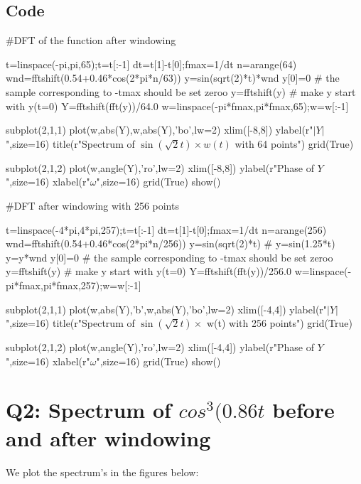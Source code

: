 \documentclass[11pt]{article}
\begin{document}
\subsection{Code}
\begin{python}
#DFT of the function after windowing

t=linspace(-pi,pi,65);t=t[:-1]
dt=t[1]-t[0];fmax=1/dt
n=arange(64)
wnd=fftshift(0.54+0.46*cos(2*pi*n/63))
y=sin(sqrt(2)*t)*wnd
y[0]=0 # the sample corresponding to -tmax should be set zeroo
y=fftshift(y) # make y start with y(t=0)
Y=fftshift(fft(y))/64.0
w=linspace(-pi*fmax,pi*fmax,65);w=w[:-1]

subplot(2,1,1)
plot(w,abs(Y),w,abs(Y),'bo',lw=2)
xlim([-8,8])
ylabel(r"$|Y|$",size=16)
title(r"Spectrum of $\sin\left(\sqrt{2}t\right)\times w(t)$ with 64 points")
grid(True)

subplot(2,1,2)
plot(w,angle(Y),'ro',lw=2)
xlim([-8,8])
ylabel(r"Phase of $Y$",size=16)
xlabel(r"$\omega$",size=16)
grid(True)
show()

#DFT after windowing with 256 points


t=linspace(-4*pi,4*pi,257);t=t[:-1]
dt=t[1]-t[0];fmax=1/dt
n=arange(256)
wnd=fftshift(0.54+0.46*cos(2*pi*n/256))
y=sin(sqrt(2)*t)
# y=sin(1.25*t)
y=y*wnd
y[0]=0 # the sample corresponding to -tmax should be set zeroo
y=fftshift(y) # make y start with y(t=0)
Y=fftshift(fft(y))/256.0
w=linspace(-pi*fmax,pi*fmax,257);w=w[:-1]

subplot(2,1,1)
plot(w,abs(Y),'b',w,abs(Y),'bo',lw=2)
xlim([-4,4])
ylabel(r"$|Y|$",size=16)
title(r"Spectrum of $\sin\left(\sqrt{2}t\right)\times$ w(t) with 256 points")
grid(True)

subplot(2,1,2)
plot(w,angle(Y),'ro',lw=2)
xlim([-4,4])
ylabel(r"Phase of $Y$",size=16)
xlabel(r"$\omega$",size=16)
grid(True)
show()
\end{python}



\section{Q2: Spectrum of $cos^3(0.86t$ before and after windowing}
We plot the spectrum's in the figures below:
\end{document}

